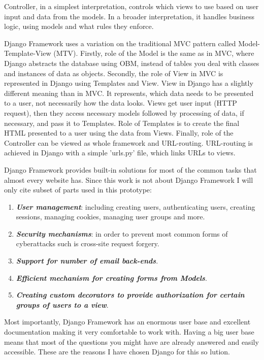 Controller, in a simplest interpretation, controls which views to use based on user input and data from the models. In a broader interpretation, it handles business logic, using models and what rules they enforce.

Django Framework uses a variation on the traditional MVC pattern called Model-Template-View (MTV). Firstly, role of the Model is the same as in MVC, where Django abstracts the database using OBM, instead of tables you deal with classes and instances of data as objects. Secondly, the role of View in MVC is represented in Django using Templates and View. View in Django has a slightly different meaning than in MVC. It represents, which data needs to be presented to a user, not necessarily how the data looks. Views get user input (HTTP request), then they access necessary models followed by processing of data, if necessary, and pass it to Templates. Role of Templates is to create the final HTML presented to a user using the data from Views. Finally, role of the Controller can be viewed as whole framework and URL-routing. URL-routing is achieved in Django with a simple 'urls.py' file, which links URLs to views.

Django Framework provides built-in solutions for most of the common tasks that almost every website has. Since this work is not about Django Framework I will only cite subset of parts used in this prototype:

\begin{enumerate}
	\setlength{\itemsep}{1pt}
	\item \textbf{\textit{User management}}: including creating users, authenticating users, creating sessions, managing cookies, managing user groups and more.
	\item \textbf{\textit{Security mechanisms}}: in order to prevent most common forms of cyberattacks such is cross-site request forgery.
	\item \textbf{\textit{Support for number of email back-ends}}.
	\item \textbf{\textit{Efficient mechanism for creating forms from Models}}.
	\item \textbf{\textit{Creating custom decorators to provide authorization for certain groups of users to a view}}.
\end{enumerate}

Most importantly, Django Framework has an enormous user base and excellent documentation making it very comfortable to work with. Having a big user base means that most of the questions you might have are already answered and easily accessible. These are the reasons I have chosen Django for this so lution.

